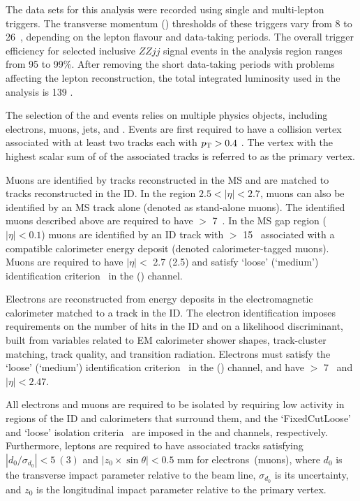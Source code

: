 The data sets for this analysis were recorded using single and multi-lepton triggers.
The transverse momentum (\pT) thresholds of these triggers vary from 8 to 26~\GeV{},
depending on the lepton flavour and data-taking periods.
The overall trigger efficiency for selected inclusive $ZZjj$ signal events in the analysis region ranges from 95 to 99\%{}.
After removing the short data-taking periods with problems affecting the lepton reconstruction,
the total integrated luminosity used in the analysis is 139 \ifb.

The selection of the \lllljj and \llvvjj events relies on multiple physics objects, including electrons, muons, jets, and \met.
Events are first required to have a collision vertex associated with at least two tracks each with $p_{\text{T}}>0.4$ \GeV.
The vertex with the highest scalar sum of \pt{} of the associated tracks is referred to as the primary vertex.

Muons are identified by tracks reconstructed in the MS and are matched to tracks reconstructed in the ID. In the region $2.5<|\eta|<2.7$, muons can also be identified by an MS track alone (denoted as stand-alone muons).
The identified muons described above are required to have \pT{} $>$ 7~\GeV{}.
In the MS gap region ($|\eta|<0.1$) muons are identified by an ID track with \pT{} $>$ 15~\GeV{}
associated with a compatible calorimeter energy deposit (denoted calorimeter-tagged muons).
Muons are required to have $|\eta| <$ 2.7 (2.5) and satisfy `loose' (`medium') identification criterion~\cite{PERF-2015-10} in the \lllljj (\llvvjj) channel. 

Electrons are reconstructed from energy deposits in the electromagnetic calorimeter matched to a track in the ID.
The electron identification imposes requirements on the number of hits in the ID and on a likelihood discriminant,
built from variables related to EM calorimeter shower shapes, track-cluster matching, track quality, and transition radiation.
Electrons must satisfy the `loose' (`medium') identification criterion~\cite{Aaboud:2019ynx} in the \lllljj (\llvvjj) channel, and have \pT{} $>$ 7~\GeV{} and $|\eta| < 2.47$.

All electrons and muons are required to be isolated by requiring low activity in regions of the ID and calorimeters that surround them,
and the `FixedCutLoose' and `loose' isolation criteria~\cite{PERF-2015-10,Aaboud:2019ynx} are imposed in the \lllljj and \llvvjj channels, respectively. Furthermore, leptons are required to have associated tracks satisfying $|d_0/\sigma_{d_0}|<5~(3)$ and $|z_0\times\sin\theta|<0.5$ mm for electrons~(muons), where $d_0$ is the transverse impact parameter relative to the beam line, $\sigma_{d_0}$ is its uncertainty, and $z_0$ is the longitudinal impact parameter relative to the primary vertex.

